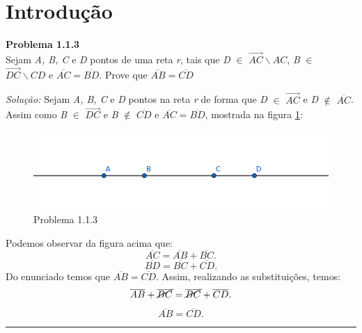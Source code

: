 \documentclass[a4paper, 11pt]{book}
\newenvironment{problem}[2][Problema] 
    { \begin{mdframed}[backgroundcolor=gray!20] \textbf{#1 #2} \\}
    {  \end{mdframed}}
\newenvironment{solution}
    {\textit{Solução:}}
    {}
\begin{document}
\section{Introdução}
\begin{problem}{1.1.3}
    \label{prob:1.1.3}
    Sejam \textit{A, B, C} e \textit{D} pontos de uma reta \textit{r}, tais que \textit{D} $\in$ $\overrightarrow{AC} \backslash AC$, \textit{B} $\in$  $\overrightarrow{DC} \backslash CD$ e $\overline{AC} = \overline{BD}$. Prove que  $\overline{AB} = \overline{CD}$   
\end{problem}
\begin{solution}
    Sejam \textit{A, B, C} e \textit{D} pontos na reta \textit{r} de forma que \textit{D} $\in$ $\overrightarrow{AC}$ e \textit{D} $\notin$ $\overline{AC}$. Assim como \textit{B} $\in$  $\overrightarrow{DC}$ e  \textit{B} $\notin$ $\overline{CD}$ e  $\overline{AC} = \overline{BD}$, mostrada na figura \ref{fig:1.1.3}:     
    
    \begin{figure}[H]
        \centering
        \includegraphics[scale=0.5]{imagens/1_1_3.png}
        \caption{Problema 1.1.3}
        \label{fig:1.1.3}
    \end{figure}

Podemos observar da figura acima que:
\[
    \overline{AC} = \overline{AB} + \overline{BC}
.\] 
\[
    \overline{BD} = \overline{BC} + \overline{CD}
.\] 
Do enunciado temos que $\overline{AB} = \overline{CD}$. Assim, realizando as substituições, temos:
\[
    \overline{AB} + \cancel{\overline{BC}} = \cancel{\overline{BC}} + \overline{CD}
.\] 
\[
    \overline{AB} = \overline{CD}
.\] 


\end{solution} 
\noindent\rule{7in}{2.8pt}\\

\end{document}
